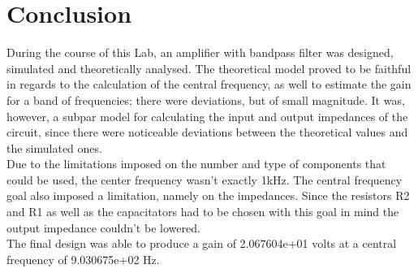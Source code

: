 \section{Conclusion}
\label{sec:conclusion} 
During the course of this Lab, an amplifier with bandpass filter was designed, simulated and theoretically analysed. The theoretical model proved to be faithful in regards to the calculation of the central frequency, as well to estimate the gain for a band of frequencies; there were deviations, but of small magnitude. It was, however, a subpar model for calculating the input and output impedances of the circuit, since there were noticeable deviations between the theoretical values and the simulated ones.\\
Due to the limitations imposed on the number and type of components that could be used, the center frequency wasn't exactly 1kHz. The central frequency goal also imposed a limitation, namely on the impedances. Since the resistors R2 and R1 as well as the capacitators had to be chosen with this goal in mind the output impedance couldn't be lowered.\\
The final design was able to produce a gain of 2.067604e+01 volts at a central frequency of 9.030675e+02 Hz.\\
